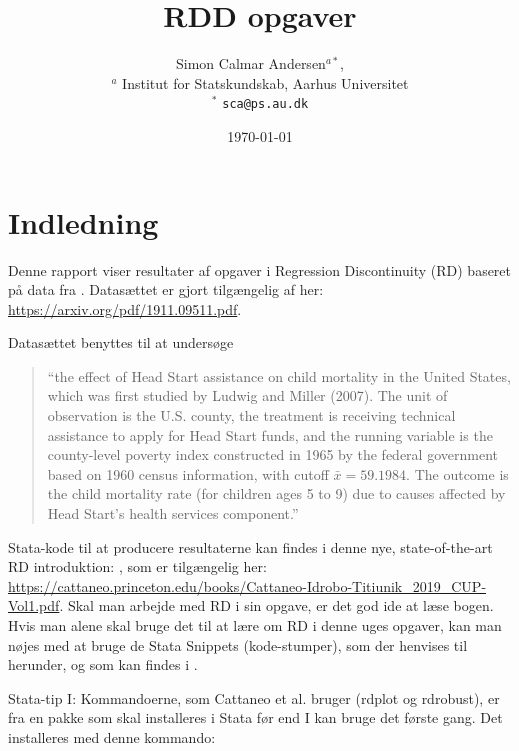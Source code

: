 \documentclass[12pt]{article}
\title{RDD opgaver }
\author{Simon Calmar Andersen$^{a*}$,  \\
        \small $^{a}$ Institut for Statskundskab, Aarhus Universitet \\
        \small $^{*}$ \tt{sca@ps.au.dk}}
\date{\today} %
\begin{document}
\doublespacing

\maketitle




\section*{Indledning}
Denne rapport viser resultater af opgaver i Regression Discontinuity (RD) baseret på data fra \autocite{ludwig_does_2007}. Datasættet er gjort tilgængelig af \autocite{calonico_regression_2018} her: \url{https://arxiv.org/pdf/1911.09511.pdf}.

Datasættet benyttes til at undersøge
	\begin{quote}
	``the effect of Head Start assistance on child mortality in the United States, which was first studied by Ludwig and Miller (2007). The unit of observation is the U.S. county, the treatment is receiving technical assistance to apply for Head Start funds, and the running variable is the county-level poverty index constructed in 1965 by the federal government based on 1960 census information, with cutoff $\bar{x} =59.1984$. The outcome is the child mortality rate (for children ages 5 to 9) due to causes affected by Head Start's health services component.'' \autocite{calonico_regression_2018}
	\end{quote}


Stata-kode til at producere resultaterne kan findes i denne nye, state-of-the-art RD introduktion:
\textcite{cattaneo_practical_2020}, som er tilgængelig her: \url{https://cattaneo.princeton.edu/books/Cattaneo-Idrobo-Titiunik_2019_CUP-Vol1.pdf}. Skal man arbejde med RD i sin opgave, er det god ide at læse bogen. Hvis man alene skal bruge det til at lære om RD i denne uges opgaver, kan man nøjes med at bruge de Stata Snippets (kode-stumper), som der henvises til herunder, og som kan findes i \textcite{cattaneo_practical_2020}.

Stata-tip I: Kommandoerne, som Cattaneo et al. bruger (rdplot og rdrobust), er fra en pakke som skal installeres i Stata før end I kan bruge det første gang. Det installeres med denne kommando:
\end{document}
